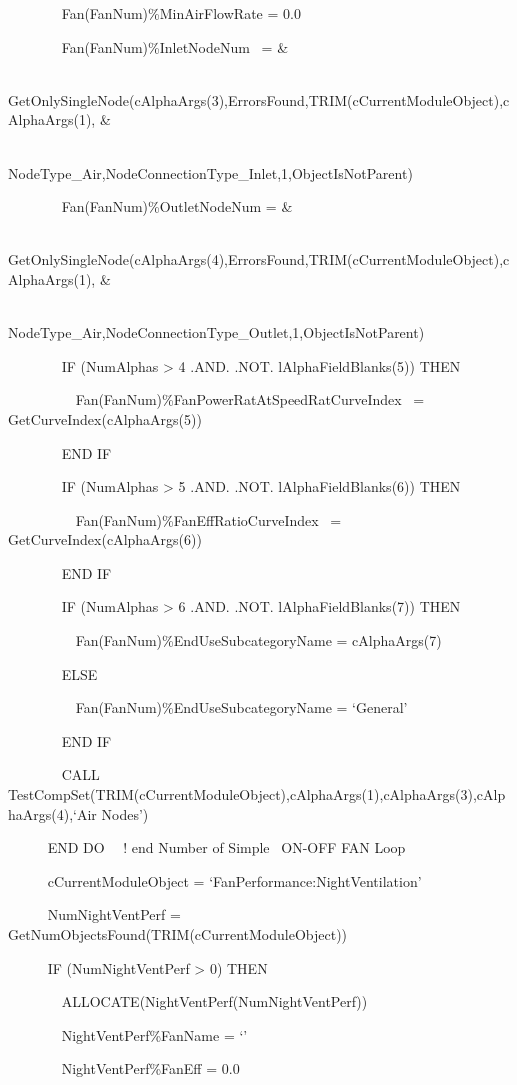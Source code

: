 ~~~~~~~ Fan(FanNum)\%MinAirFlowRate = 0.0

~~~~~~~ Fan(FanNum)\%InletNodeNum~ = \&

~~~~~~~~~~~~~~ GetOnlySingleNode(cAlphaArgs(3),ErrorsFound,TRIM(cCurrentModuleObject),cAlphaArgs(1), \&

~~~~~~~~~~~~~~~~~~~~~~~~~~~ NodeType\_Air,NodeConnectionType\_Inlet,1,ObjectIsNotParent)

~~~~~~~ Fan(FanNum)\%OutletNodeNum = \&

~~~~~~~~~~~~~~ GetOnlySingleNode(cAlphaArgs(4),ErrorsFound,TRIM(cCurrentModuleObject),cAlphaArgs(1), \&

~~~~~~~~~~~~~~~~~~~~~~~~~~~ NodeType\_Air,NodeConnectionType\_Outlet,1,ObjectIsNotParent)

~~~~~~~ IF (NumAlphas \textgreater{} 4 .AND. .NOT. lAlphaFieldBlanks(5)) THEN

~~~~~~~~~ Fan(FanNum)\%FanPowerRatAtSpeedRatCurveIndex~ = GetCurveIndex(cAlphaArgs(5))

~~~~~~~ END IF

~~~~~~~ IF (NumAlphas \textgreater{} 5 .AND. .NOT. lAlphaFieldBlanks(6)) THEN

~~~~~~~~~ Fan(FanNum)\%FanEffRatioCurveIndex~ = GetCurveIndex(cAlphaArgs(6))

~~~~~~~ END IF

~~~~~~~ IF (NumAlphas \textgreater{} 6 .AND. .NOT. lAlphaFieldBlanks(7)) THEN

~~~~~~~~~ Fan(FanNum)\%EndUseSubcategoryName = cAlphaArgs(7)

~~~~~~~ ELSE

~~~~~~~~~ Fan(FanNum)\%EndUseSubcategoryName = `General'

~~~~~~~ END IF

~~~~~~~ CALL TestCompSet(TRIM(cCurrentModuleObject),cAlphaArgs(1),cAlphaArgs(3),cAlphaArgs(4),`Air Nodes')

~ ~~~~END DO~~ ! end Number of Simple~ ON-OFF FAN Loop

~~~~~ cCurrentModuleObject = `FanPerformance:NightVentilation'

~~~~~ NumNightVentPerf = GetNumObjectsFound(TRIM(cCurrentModuleObject))

~~~~~ IF (NumNightVentPerf \textgreater{} 0) THEN

~~~~~~~ ALLOCATE(NightVentPerf(NumNightVentPerf))

~~~~~~~ NightVentPerf\%FanName = `'

~~~~~~~ NightVentPerf\%FanEff = 0.0

